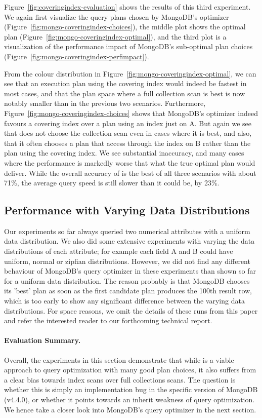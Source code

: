 Figure~\ref{fig:coveringindex-evaluation} shows the results of this third experiment.
We again first visualize the query plans chosen by MongoDB's \approachName optimizer (Figure~\ref{fig:mongo-coveringindex-choices}), the middle plot shows the optimal plan (Figure~\ref{fig:mongo-coveringindex-optimal}), and the third plot is a visualization of the performance impact of MongoDB's sub-optimal plan choices (Figure~\ref{fig:mongo-coveringindex-perfimpact}).

From the colour distribution in Figure~\ref{fig:mongo-coveringindex-optimal}, we can see that an execution plan using the covering index would indeed be fastest in most cases, and that the plan space where a full collection scan is best is now notably smaller than in the previous two scenarios. Furthermore, Figure~\ref{fig:mongo-coveringindex-choices} shows that MongoDB's \approachName optimizer indeed favours a covering index over a plan using an index just on A. But again we see that \approachName does not choose the collection scan even in cases where it is best, and also, that it often chooses a plan that access through the index on B rather than the plan using the covering index. We see substantial inaccuracy, and many cases where the performance is markedly worse that what the true optimal plan would deliver. While the overall accuracy of \approachName is the best of all three scenarios with about 71\%, the average query speed is still slower than it could be, by 23\%.



\subsection{Performance with Varying Data Distributions}
Our experiments so far always queried two numerical attributes with a uniform data distribution. We also did some extensive experiments with varying the data distributions of each attribute; for example each field A and B could have uniform, normal or zipfian distributions. 
However, we did not find any different behaviour of MongoDB's query optimizer in these experiments than shown so far for a uniform data distribution. 
The reason probably is that MongoDB chooses its 'best' plan as soon as the first candidate plan produces the 100th result row, which is too early to show any significant difference between the varying data distributions.
For space reasons, we omit the details of these runs from this paper and refer the interested reader to our forthcoming technical report. 

\paragraph{\textbf{Evaluation Summary.}} Overall, the experiments in this section demonstrate that while \approachName is a viable approach to query optimization with many good plan choices, it also suffers from a clear bias towards index scans over full collections scans. The question is whether this is simply an implementation bug in the specific version of MongoDB (v4.4.0), or whether it points towards an inherit weakness of \approachName query optimization.
We hence take a closer look into MongoDB's query optimizer in the next section.